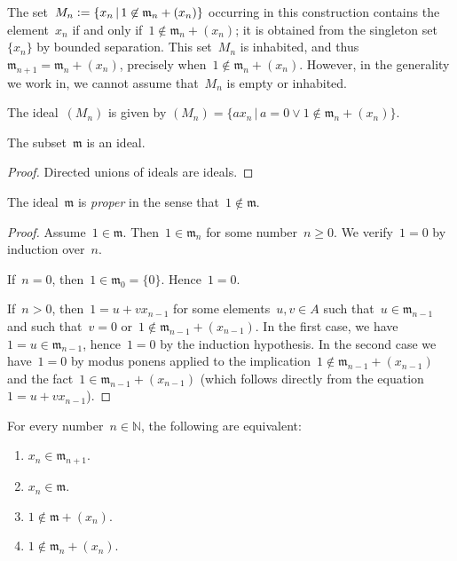 \documentclass[envcountsect,envcountsame,runningheads]{llncs}
\newcommand{\mmm}{\mathfrak{m}}
\newcommand{\NN}{\mathbb{N}}
\newcommand{\defeq}{\vcentcolon=}
\renewcommand{\_}{\mathpunct{.}\,}
\begin{document}
The set~$M_n \defeq \{ x_n \,|\, 1 \not\in \mmm_n + (x_n) \}$ occurring in this
construction contains the element~$x_n$ if and only if~$1 \not\in \mmm_n +
(x_n)$; it is obtained from the singleton set~$\{x_n\}$ by bounded separation.
This set~$M_n$ is inhabited, and thus~$\mmm_{n+1} = \mmm_n + (x_n)$, precisely when~$1 \not\in \mmm_n + (x_n)$.
However, in the generality we work in, we cannot assume that~$M_n$ is empty or
inhabited.

The ideal~$(M_n)$ is given by
$(M_n) = \{ a x_n \,|\, a = 0 \vee 1 \not\in \mmm_n + (x_n) \}$.

\begin{proposition}The subset~$\mmm$ is an ideal.
\end{proposition}

\begin{proof}Directed unions of ideals are ideals.\end{proof}

\begin{proposition}\label{prop:proper}
The ideal~$\mmm$ is \emph{proper} in the sense that~$1 \not\in \mmm$.\end{proposition}

\begin{proof}Assume~$1 \in \mmm$. Then~$1 \in \mmm_n$ for some number~$n \geq 0$. We
verify~$1 = 0$ by induction over~$n$.

If~$n = 0$, then~$1 \in \mmm_0 = \{0\}$. Hence~$1 = 0$.

If~$n > 0$, then~$1 = u + v x_{n-1}$ for some elements~$u,v \in A$ such that~$u
\in \mmm_{n-1}$ and such that~$v = 0$ or~$1 \not\in \mmm_{n-1} + (x_{n-1})$.
In the first case, we have~$1 = u \in \mmm_{n-1}$, hence~$1 = 0$ by the induction
hypothesis. In the second case we have~$1 = 0$ by modus ponens applied to the
implication~$1 \not\in \mmm_{n-1} + (x_{n-1})$ and the fact~$1 \in \mmm_{n-1} +
(x_{n-1})$ (which follows directly from the equation~$1 = u + v x_{n-1}$).
\end{proof}

\begin{lemma}\label{lemma:stage}
For every number~$n \in \NN$, the following are equivalent:
\begin{enumerate}
\item $x_n \in \mmm_{n+1}$.
\item $x_n \in \mmm$.
\item $1 \not\in \mmm + (x_n)$.
\item $1 \not\in \mmm_n + (x_n)$.
\end{enumerate}
\end{lemma}
\end{document}
